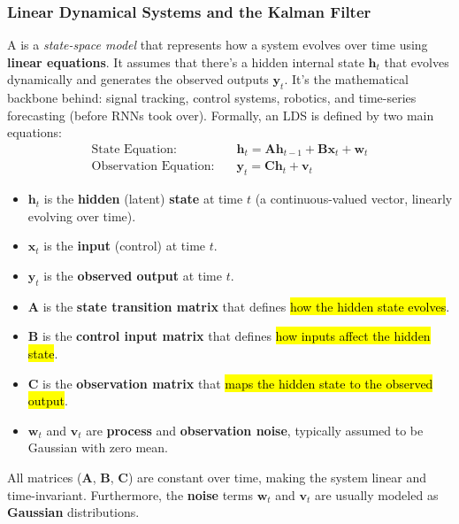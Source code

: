 \subsubsection{Linear Dynamical Systems and the Kalman Filter}\label{sec:lds-kalman-filter}

A  is a \emph{state-space model} that represents how a system evolves over time using \textbf{linear equations}. It assumes that there's a hidden internal state $\mathbf{h}_t$ that evolves dynamically and generates the observed outputs $\mathbf{y}_t$. It's the mathematical backbone behind: signal tracking, control systems, robotics, and time-series forecasting (before RNNs took over). Formally, an LDS is defined by two main equations:
\begin{align}
    \text{State Equation:} \quad & \mathbf{h}_t = \mathbf{A} \mathbf{h}_{t-1} + \mathbf{B} \mathbf{x}_t + \mathbf{w}_t \\
    \text{Observation Equation:} \quad & \mathbf{y}_t = \mathbf{C} \mathbf{h}_t + \mathbf{v}_t
\end{align}
\begin{itemize}
    \item $\mathbf{h}_t$ is the \textbf{hidden} (latent) \textbf{state} at time $t$ (a continuous-valued vector, linearly evolving over time).
    \item $\mathbf{x}_t$ is the \textbf{input} (control) at time $t$.
    \item $\mathbf{y}_t$ is the \textbf{observed output} at time $t$.
    \item $\mathbf{A}$ is the \textbf{state transition matrix} that defines \hl{how the hidden state evolves}.
    \item $\mathbf{B}$ is the \textbf{control input matrix} that defines \hl{how inputs affect the hidden state}.
    \item $\mathbf{C}$ is the \textbf{observation matrix} that \hl{maps the hidden state to the observed output}.
    \item $\mathbf{w}_t$ and $\mathbf{v}_t$ are \textbf{process} and \textbf{observation noise}, typically assumed to be Gaussian with zero mean.
\end{itemize}
All matrices ($\mathbf{A}$, $\mathbf{B}$, $\mathbf{C}$) are constant over time, making the system linear and time-invariant. Furthermore, the \textbf{noise} terms $\mathbf{w}_t$ and $\mathbf{v}_t$ are usually modeled as \textbf{Gaussian} distributions.

